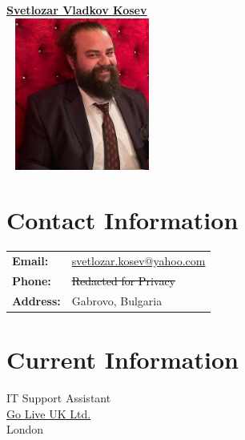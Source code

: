 \documentclass[letterpaper,10pt]{article}
\begin{document}
	
	\pagestyle{empty} %
		
\begin{center}
	\begin{minipage}[t]{0.5\textwidth}
		\centering
		\Large\textbf{\href{https://www.linkedin.com/in/svetlozar-kosev-m-sc-it-278058144/}{Svetlozar Vladkov Kosev}}\\[2ex]
		\includegraphics[width=5cm,height=5cm, keepaspectratio]{photo.jpg}
	\end{minipage}%
	\begin{minipage}[t]{0.5\textwidth}
		\section*{Contact Information}
		\begin{tabular}{@{}l l}
			\textbf{Email:} & \href{mailto:svetlozar.kosev@yahoo.com}{svetlozar.kosev@yahoo.com} \\
			\textbf{Phone:} & \textcolor{black}{\st{Redacted for Privacy}} \\
			\textbf{Address:} & Gabrovo, Bulgaria \\
		\end{tabular}
		
		\section*{Current Information}
		IT Support Assistant \\
		\href{https://www.goliveuk.com/}{Go Live UK Ltd.} \\
		London \\
	\end{minipage}
\end{center}
		
\end{document}

